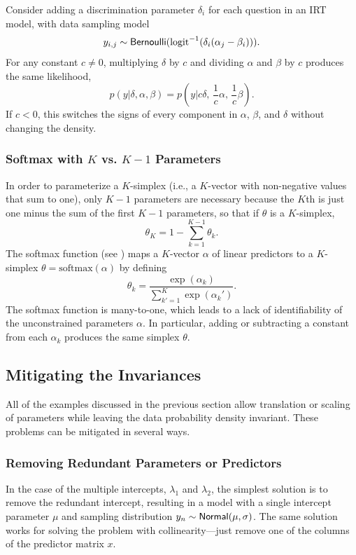 Consider adding a discrimination parameter $\delta_i$ for each
question in an IRT model, with data sampling model
\[
y_{i,j} \sim \distro{Bernoulli}(\mbox{logit}^{-1}(\delta_i(\alpha_j - \beta_i))).
\]
For any constant $c \neq 0$, multiplying $\delta$ by $c$ and dividing
$\alpha$ and $\beta$ by $c$ produces the same likelihood,
\[
p(y|\delta,\alpha,\beta)
= p(y|c \delta, \, \frac{1}{c}\alpha, \, \frac{1}{c}\beta).
\]
If $c < 0$, this switches the signs of every component in $\alpha$,
$\beta$, and $\delta$ without changing the density.


\subsubsection{Softmax with $K$ vs. $K-1$ Parameters}

In order to parameterize a $K$-simplex (i.e., a $K$-vector with
non-negative values that sum to one), only $K - 1$ parameters are
necessary because the $K$th is just one minus the sum of the first $K
- 1$ parameters, so that if $\theta$ is a $K$-simplex,
%
\[
\theta_K = 1 - \sum_{k=1}^{K-1} \theta_k.
\]
%
The softmax function (see ) maps a $K$-vector
$\alpha$ of linear predictors to a $K$-simplex $\theta =
\mbox{softmax}(\alpha)$ by defining
%
\[
\theta_k = \frac{\exp(\alpha_k)}{\sum_{k'=1}^K \exp(\alpha_k')}.
\]
%
The softmax function is many-to-one, which leads to a lack of
identifiability of the unconstrained parameters $\alpha$.  In
particular, adding or subtracting a constant from each $\alpha_k$
produces the same simplex $\theta$. 



\subsection{Mitigating the Invariances}

All of the examples discussed in the previous section allow
translation or scaling of parameters while leaving the data
probability density invariant.  These problems can be mitigated in
several ways.

\subsubsection{Removing Redundant Parameters or Predictors}

In the case of the multiple intercepts, $\lambda_1$ and $\lambda_2$,
the simplest solution is to remove the redundant intercept, resulting
in a model with a single intercept parameter $\mu$ and sampling
distribution $y_n \sim \distro{Normal}(\mu, \sigma)$.  The same
solution works for solving the problem with collinearity---just remove
one of the columns of the predictor matrix $x$.

